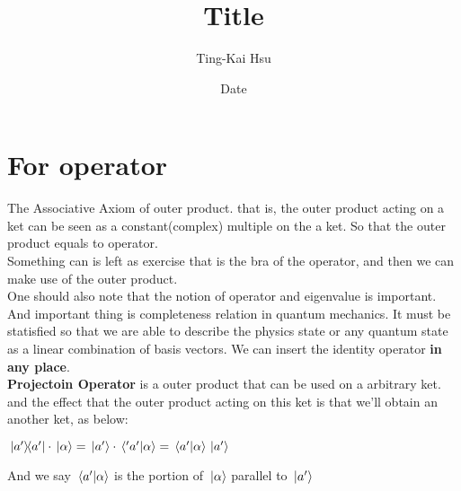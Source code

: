\documentclass[12pt]{article}
\title{Title}
\author{Ting-Kai Hsu}
\date{Date}
\begin{document}
\section{For operator}
The Associative Axiom of outer product.
that is, the outer product acting on a ket can be seen as a constant(complex) multiple on the a ket.
So that the outer product equals to operator.
\\
Something can is left as exercise that is the bra of the operator,
and then we can make use of the outer product.
\\
One should also note that the notion of operator and eigenvalue is important.
\\
And important thing is completeness relation in quantum mechanics.
It must be statisfied so that we are able to describe the physics state or any quantum state as a linear combination of basis vectors.
We can insert the identity operator \textbf{in any place}.
\\
\textbf{Projectoin Operator} is a outer product that can be used on a arbitrary ket.
and the effect that the outer product acting on this ket is that we'll obtain an another ket, as below:
\begin{center}
$\ketbra*{a'}{a'} \cdot \ket*{\alpha} = \ket*{a'} \cdot \braket*{'a'}{\alpha } = \braket*{a'}{\alpha } \ket*{a'}$
\end{center}
And we say $\braket*{a'}{ \alpha}$ is the portion of $\ket*{\alpha}$ parallel to $\ket*{a'}$ 
\end{document}

